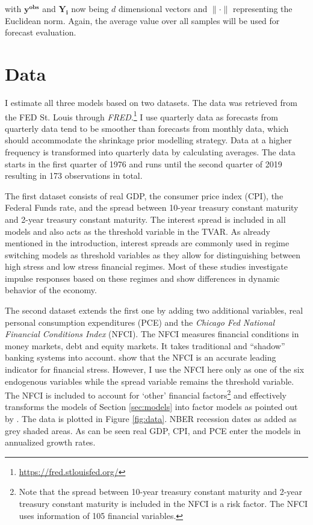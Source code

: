 \documentclass[12pt,letterpaper,fleqn]{article}           %
\begin{document}
with $\mathbf{y^{obs}}$ and $\mathbf{Y_i}$ now being $d$ dimensional vectors and $\| \cdot \|$ representing the Euclidean norm. Again, the average value over all samples will be used for forecast evaluation.

\section{Data}
\label{sec:data}

I estimate all three models based on two datasets. The data was retrieved from the FED St. Louis through \textit{FRED}.\footnote{\url{https://fred.stlouisfed.org/}} I use quarterly data as forecasts from quarterly data tend to be smoother than forecasts from monthly data, which should accommodate the shrinkage prior modelling strategy. Data at a higher frequency is transformed into quarterly data by calculating averages. The data starts in the first quarter of 1976 and runs until the second quarter of 2019 resulting in 173 observations in total.

The first dataset consists of real GDP, the consumer price index (CPI), the Federal Funds rate, and the spread between 10-year treasury constant maturity and 2-year treasury constant maturity. The interest spread is included in all models and also acts as the threshold variable in the TVAR. As already mentioned in the introduction, interest spreads are commonly used in regime switching models as threshold variables as they allow for distinguishing between high stress and low stress financial regimes. Most of these studies investigate impulse responses based on these regimes and show differences in dynamic behavior of the economy.

The second dataset extends the first one by adding two additional variables, real personal consumption expenditures (PCE) and the \textit{Chicago Fed National Financial Conditions Index} (NFCI). The NFCI measures financial conditions in money markets, debt and equity markets. It takes traditional and ``shadow'' banking systems into account. \textcite{brave12} show that the NFCI is an accurate leading indicator for financial stress. However, I use the NFCI here only as one of the six endogenous variables while the spread variable remains the threshold variable.
The NFCI is included to account for `other' financial factors\footnote{Note that the spread between 10-year treasury constant maturity and 2-year treasury constant maturity is included in the NFCI is a risk factor. The NFCI uses information of 105 financial variables.} and effectively transforms the models of Section \ref{sec:models} into factor models as pointed out by \textcite{alessandri17}. The data is plotted in Figure \ref{fig:data}. NBER recession dates as added as grey shaded areas. As can be seen real GDP, CPI, and PCE enter the models in annualized growth rates.
\end{document}
